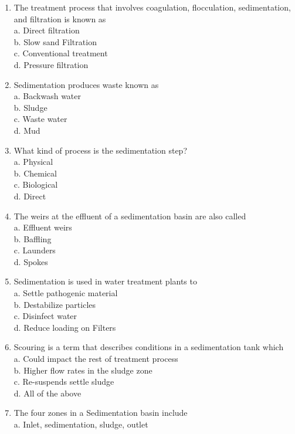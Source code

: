 \begin{enumerate}
\item The treatment process that involves coagulation, flocculation, sedimentation, and filtration is known as\\
a. Direct filtration\\
b. Slow sand Filtration\\
c. Conventional treatment\\
d. Pressure filtration\\
\item Sedimentation produces waste known as\\
a. Backwash water\\
b. Sludge\\
c. Waste water\\
d. Mud\\
\item What kind of process is the sedimentation step?\\
a. Physical\\
b. Chemical\\
c. Biological\\
d. Direct\\
\item The weirs at the effluent of a sedimentation basin are also called\\
a. Effluent weirs\\
b. Baffling\\
c. Launders\\
d. Spokes\\
\item Sedimentation is used in water treatment plants to\\
a. Settle pathogenic material\\
b. Destabilize particles\\
c. Disinfect water\\
d. Reduce loading on Filters\\
\item Scouring is a term that describes conditions in a sedimentation tank which\\
a. Could impact the rest of treatment process\\
b. Higher flow rates in the sludge zone\\
c. Re-suspends settle sludge\\
d. All of the above\\
\item The four zones in a Sedimentation basin include\\
a. Inlet, sedimentation, sludge, outlet\\

\end{enumerate}
